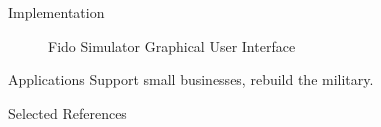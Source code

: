 \documentclass[final]{beamer}
\newlength{\onecolwid}
\begin{document}
\begin{frame}[t]
\begin{columns}[t]
\begin{column}{\onecolwid}
\begin{block}{Implementation}
		\begin{figure}
			\centering
			\caption{Fido Simulator Graphical User Interface}
		\end{figure}
	\end{block}

	\begin{block}{Applications}
		Support small businesses, rebuild the military.
	\end{block}

	\begin{block}{Selected References}
		\nocite{*}
		{\fontsize{25}{30}\vspace{0.75in}}
	\end{block}

\end{column}

\end{columns}
\end{frame}
\end{document}
